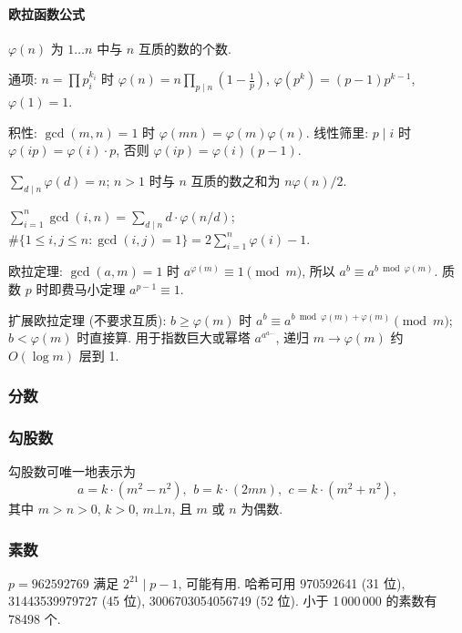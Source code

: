 	\paragraph{欧拉函数公式}
		$\varphi(n)$ 为 $1\dots n$ 中与 $n$ 互质的数的个数.
		\begin{compactitem}
		\item 通项: $n=\prod p_i^{k_i}$ 时 $\varphi(n)=n\prod_{p\mid n}\left(1-\frac1p\right)$, $\varphi(p^k)=(p-1)p^{k-1}$, $\varphi(1)=1$.
		\item 积性: $\gcd(m,n)=1$ 时 $\varphi(mn)=\varphi(m)\varphi(n)$. 线性筛里: $p\mid i$ 时 $\varphi(ip)=\varphi(i)\cdot p$, 否则 $\varphi(ip)=\varphi(i)(p-1)$.
		\item $\sum_{d\mid n}\varphi(d)=n$; $n>1$ 时与 $n$ 互质的数之和为 $n\varphi(n)/2$.
		\item $\sum_{i=1}^{n}\gcd(i,n)=\sum_{d\mid n}d\cdot\varphi(n/d)$; $\#\{1\le i,j\le n:\gcd(i,j)=1\}=2\sum_{i=1}^{n}\varphi(i)-1$.
		\item 欧拉定理: $\gcd(a,m)=1$ 时 $a^{\varphi(m)}\equiv1\pmod m$, 所以 $a^b\equiv a^{b\bmod\varphi(m)}$. 质数 $p$ 时即费马小定理 $a^{p-1}\equiv1$.
		\item 扩展欧拉定理 (不要求互质): $b\ge\varphi(m)$ 时 $a^b\equiv a^{b\bmod\varphi(m)+\varphi(m)}\pmod m$; $b<\varphi(m)$ 时直接算. 用于指数巨大或幂塔 $a^{a^{a\cdots}}$, 递归 $m\to\varphi(m)$ 约 $O(\log m)$ 层到 1.
		\end{compactitem}

\subsubsection{分数}

\subsubsection{勾股数}
 勾股数可唯一地表示为
 \[ a=k\cdot (m^{2}-n^{2}),\ \,b=k\cdot (2mn),\ \,c=k\cdot (m^{2}+n^{2}), \]
 其中 $m > n > 0$, $k > 0$, $m \bot n$, 且 $m$ 或 $n$ 为偶数.

\subsubsection{素数}
	$p=962592769$ 满足 $2^{21} \mid p-1$, 可能有用. 哈希可用
	970592641 (31 位), 31443539979727 (45 位), 3006703054056749
	(52 位). 小于 1\,000\,000 的素数有 78498 个.

